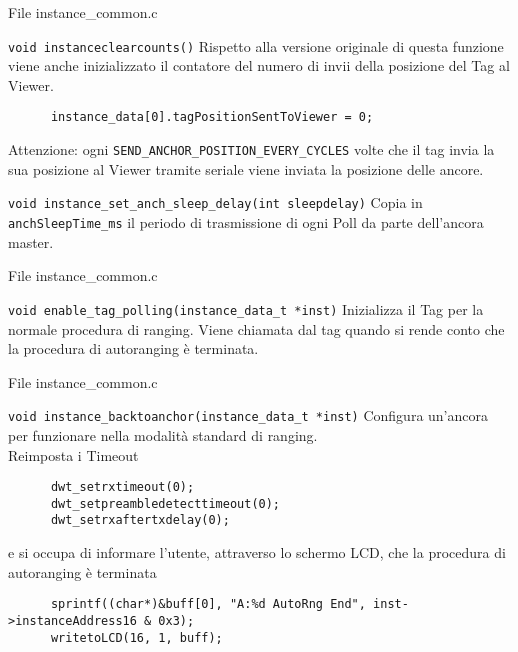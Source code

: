 \begin{frame}[fragile]{File instance\_common.c}
  \begin{block}{\lstinline!void instanceclearcounts()!}
    Rispetto alla versione originale di questa funzione viene anche inizializzato il contatore
    del numero di invii della posizione del Tag al Viewer.
    \begin{lstlisting}
      instance_data[0].tagPositionSentToViewer = 0;
    \end{lstlisting}
    \textcolor{dgreen}{Attenzione:} ogni \lstinline!SEND_ANCHOR_POSITION_EVERY_CYCLES! volte che il tag invia la sua posizione al Viewer tramite seriale viene inviata la posizione delle ancore.
  \end{block}
  \begin{block}{\lstinline!void instance_set_anch_sleep_delay(int sleepdelay)!}
    Copia in \lstinline!anchSleepTime_ms! il periodo di trasmissione di ogni Poll da parte dell'ancora master.
  \end{block}
\end{frame}

\begin{frame}{File instance\_common.c}
  \begin{block}{\lstinline!void enable_tag_polling(instance_data_t *inst)!}
    Inizializza il Tag per la normale procedura di ranging. Viene chiamata
    dal tag quando si rende conto che la procedura di autoranging è terminata.
  \end{block}
\end{frame}

\begin{frame}[fragile]{File instance\_common.c}
  \begin{block}{\lstinline!void instance_backtoanchor(instance_data_t *inst)!}
    Configura un'ancora per funzionare nella modalità standard di ranging.\\
    Reimposta i Timeout
    \begin{lstlisting}
      dwt_setrxtimeout(0);
      dwt_setpreambledetecttimeout(0);
      dwt_setrxaftertxdelay(0);
    \end{lstlisting}
    e si occupa di informare l'utente, attraverso lo schermo LCD, che la procedura di autoranging è terminata
    \begin{lstlisting}
      sprintf((char*)&buff[0], "A:%d AutoRng End", inst->instanceAddress16 & 0x3);
      writetoLCD(16, 1, buff);
    \end{lstlisting}
  \end{block}
\end{frame}

